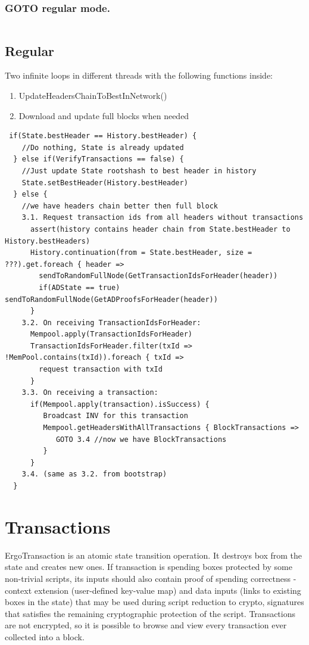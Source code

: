 \documentclass[]{article}   %
\newcommand{\coin}{box}
\begin{document}
\subsubsection{GOTO regular mode.}
\begin{verbatim}

\end{verbatim}
\subsection{Regular}
Two infinite loops in different threads with the following functions inside:
\begin{enumerate}
\item UpdateHeadersChainToBestInNetwork()
\item Download and update full blocks when needed
\end{enumerate}
\begin{verbatim}
 if(State.bestHeader == History.bestHeader) {
    //Do nothing, State is already updated
  } else if(VerifyTransactions == false) {
    //Just update State rootshash to best header in history
    State.setBestHeader(History.bestHeader)
  } else {
    //we have headers chain better then full block
    3.1. Request transaction ids from all headers without transactions
      assert(history contains header chain from State.bestHeader to History.bestHeaders)
      History.continuation(from = State.bestHeader, size = ???).get.foreach { header =>
        sendToRandomFullNode(GetTransactionIdsForHeader(header))
        if(ADState == true) sendToRandomFullNode(GetADProofsForHeader(header))
      }
    3.2. On receiving TransactionIdsForHeader:
      Mempool.apply(TransactionIdsForHeader)
      TransactionIdsForHeader.filter(txId => !MemPool.contains(txId)).foreach { txId =>
        request transaction with txId
      }
    3.3. On receiving a transaction:
      if(Mempool.apply(transaction).isSuccess) {
         Broadcast INV for this transaction
         Mempool.getHeadersWithAllTransactions { BlockTransactions =>
            GOTO 3.4 //now we have BlockTransactions
         }
      }
    3.4. (same as 3.2. from bootstrap)
  }
\end{verbatim}




\section{Transactions}

ErgoTransaction is an atomic state transition operation. It destroys \coin{} from the state
and creates new ones. If transaction is spending boxes protected by some non-trivial scripts,
its inputs should also contain proof of spending correctness - context extension (user-defined
key-value map) and data inputs (links to existing boxes in the state) that may be used during
script reduction to crypto, signatures that satisfies the remaining cryptographic protection
of the script.
Transactions are not encrypted, so it is possible to browse and view every transaction ever collected into a block.
\end{document}
